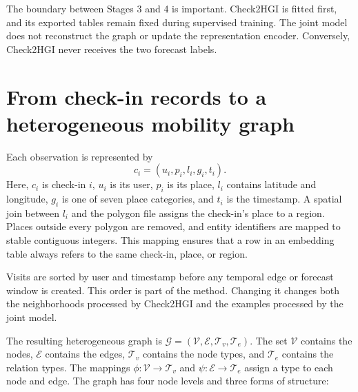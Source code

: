The boundary between Stages 3 and 4 is important. Check2HGI is fitted first, and
its exported tables remain fixed during supervised training. The joint model does
not reconstruct the graph or update the representation encoder. Conversely,
Check2HGI never receives the two forecast labels.

\section{From check-in records to a heterogeneous mobility graph}
\label{sec:apx-check2hgi-input}

Each observation is represented by
\begin{equation}
    c_i=(u_i,p_i,l_i,g_i,t_i).
    \label{eq:apx-checkin-tuple}
\end{equation}
Here, $c_i$ is check-in $i$, $u_i$ is its user, $p_i$ is its place, $l_i$
contains latitude and longitude, $g_i$ is one of seven place categories, and $t_i$
is the timestamp. A spatial join between $l_i$ and the polygon file assigns the
check-in's place to a region. Places outside every polygon are removed, and entity
identifiers are mapped to stable contiguous integers. This mapping ensures that a
row in an embedding table always refers to the same check-in, place, or region.

Visits are sorted by user and timestamp before any temporal edge or forecast window
is created. This order is part of the method. Changing it changes both the
neighborhoods processed by Check2HGI and the examples processed by the joint model.

The resulting heterogeneous graph is
$\mathcal{G}=(\mathcal{V},\mathcal{E},\mathcal{T}_v,\mathcal{T}_e)$. The set
$\mathcal{V}$ contains the nodes, $\mathcal{E}$ contains the edges,
$\mathcal{T}_v$ contains the node types, and $\mathcal{T}_e$ contains the relation
types. The mappings $\phi:\mathcal{V}\rightarrow\mathcal{T}_v$ and
$\psi:\mathcal{E}\rightarrow\mathcal{T}_e$ assign a type to each node and edge.
The graph has four node levels and three forms of structure:

